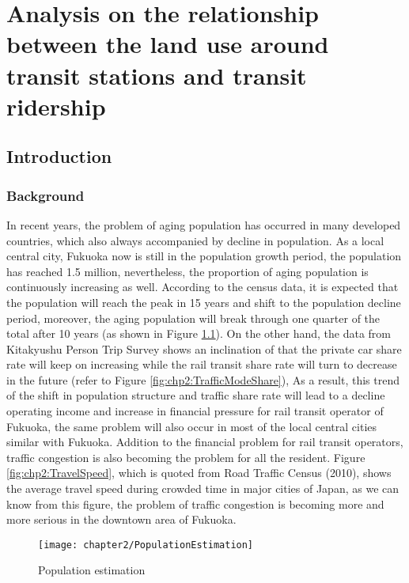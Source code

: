 \chapter{Analysis on the relationship between the land use around transit stations and transit ridership}
%
\section{Introduction}
%
\subsection{Background}
%
In recent years, the problem of aging population has occurred in many developed countries, which also always accompanied by decline in population. As a local central city, Fukuoka now is still in the population growth period, the population has reached 1.5 million, nevertheless, the proportion of aging population is continuously increasing as well. According to the census data, it is expected that the population will reach the peak in 15 years and shift to the population decline period, moreover, the aging population will break through one quarter of the total after 10 years (as shown in Figure \ref{fig:chp2:PopulationEstimation}). On the other hand, the data from Kitakyushu Person Trip Survey shows an inclination of that the private car share rate will keep on increasing while the rail transit share rate will turn to decrease in the future (refer to Figure \ref{fig:chp2:TrafficModeShare}), As a result, this trend of the shift in population structure and traffic share rate will lead to a decline operating income and increase in financial pressure for rail transit operator of Fukuoka, the same problem will also occur in most of the local central cities similar with Fukuoka. Addition to the financial problem for rail transit operators, traffic congestion is also becoming the problem for all the resident. Figure \ref{fig:chp2:TravelSpeed}, which is quoted from Road Traffic Census (2010), shows the average travel speed during crowded time in major cities of Japan, as we can know from this figure, the problem of traffic congestion is becoming more and more serious in the downtown area of Fukuoka.

%
\begin{figure}[htbp]
	\centering
	\texttt{[image: chapter2/PopulationEstimation]}
	\caption{Population estimation}
	\label{fig:chp2:PopulationEstimation}
\end{figure}

